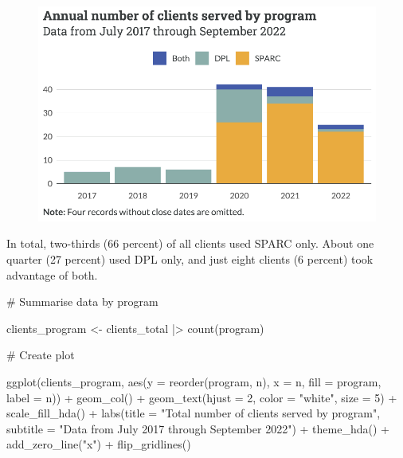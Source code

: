 \documentclass[
  letterpaper,
  DIV=11,
  numbers=noendperiod]{scrartcl}
\newenvironment{Shaded}{\begin{snugshade}}{\end{snugshade}}
\newcommand{\AttributeTok}[1]{\textcolor[rgb]{0.40,0.45,0.13}{#1}}
\newcommand{\CommentTok}[1]{\textcolor[rgb]{0.37,0.37,0.37}{#1}}
\newcommand{\DecValTok}[1]{\textcolor[rgb]{0.68,0.00,0.00}{#1}}
\newcommand{\FunctionTok}[1]{\textcolor[rgb]{0.28,0.35,0.67}{#1}}
\newcommand{\NormalTok}[1]{\textcolor[rgb]{0.00,0.23,0.31}{#1}}
\newcommand{\OtherTok}[1]{\textcolor[rgb]{0.00,0.23,0.31}{#1}}
\newcommand{\SpecialCharTok}[1]{\textcolor[rgb]{0.37,0.37,0.37}{#1}}
\newcommand{\StringTok}[1]{\textcolor[rgb]{0.13,0.47,0.30}{#1}}
\begin{document}
\begin{figure}[H]

{\centering \includegraphics{piedmont_files/figure-pdf/annual-1.pdf}

}

\end{figure}

In total, two-thirds (66 percent) of all clients used SPARC only. About
one quarter (27 percent) used DPL only, and just eight clients (6
percent) took advantage of both.

\begin{Shaded}
\begin{Highlighting}[]
\CommentTok{\# Summarise data by program}

\NormalTok{clients\_program }\OtherTok{\textless{}{-}}\NormalTok{ clients\_total }\SpecialCharTok{|\textgreater{}}     
  \FunctionTok{count}\NormalTok{(program)}

\CommentTok{\# Create plot}

\FunctionTok{ggplot}\NormalTok{(clients\_program, }\FunctionTok{aes}\NormalTok{(}\AttributeTok{y =} \FunctionTok{reorder}\NormalTok{(program, n), }\AttributeTok{x =}\NormalTok{ n, }\AttributeTok{fill =}\NormalTok{ program, }\AttributeTok{label =}\NormalTok{ n)) }\SpecialCharTok{+}
  \FunctionTok{geom\_col}\NormalTok{() }\SpecialCharTok{+}
  \FunctionTok{geom\_text}\NormalTok{(}\AttributeTok{hjust =} \DecValTok{2}\NormalTok{,}
            \AttributeTok{color =} \StringTok{"white"}\NormalTok{,}
            \AttributeTok{size =} \DecValTok{5}\NormalTok{) }\SpecialCharTok{+}
  \FunctionTok{scale\_fill\_hda}\NormalTok{() }\SpecialCharTok{+}
  \FunctionTok{labs}\NormalTok{(}\AttributeTok{title =} \StringTok{"Total number of clients served by program"}\NormalTok{,}
       \AttributeTok{subtitle =} \StringTok{"Data from July 2017 through September 2022"}\NormalTok{) }\SpecialCharTok{+}
  \FunctionTok{theme\_hda}\NormalTok{() }\SpecialCharTok{+}
  \FunctionTok{add\_zero\_line}\NormalTok{(}\StringTok{"x"}\NormalTok{) }\SpecialCharTok{+}
  \FunctionTok{flip\_gridlines}\NormalTok{()}
\end{Highlighting}
\end{Shaded}
\end{document}
